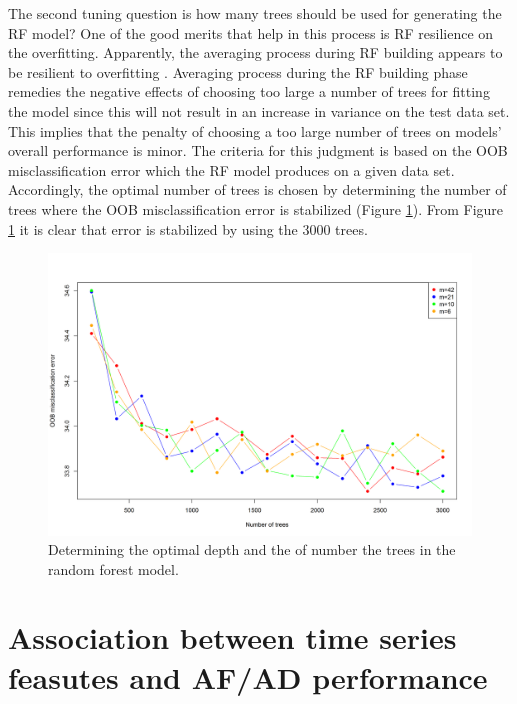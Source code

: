 \documentclass[]{elsarticle} %
\begin{document}
The second tuning question is how many trees should be used for
generating the RF model? One of the good merits that help in this
process is RF resilience on the overfitting. Apparently, the averaging
process during RF building appears to be resilient to overfitting
\citep{friedman2001elements}. Averaging process during the RF building
phase remedies the negative effects of choosing too large a number of
trees for fitting the model since this will not result in an increase in
variance on the test data set. This implies that the penalty of choosing
a too large number of trees on models' overall performance is minor. The
criteria for this judgment is based on the OOB misclassification error
which the RF model produces on a given data set. Accordingly, the
optimal number of trees is chosen by determining the number of trees
where the OOB misclassification error is stabilized (Figure
\ref{fig:tree_depth}). From Figure \ref{fig:tree_depth} it is clear that
error is stabilized by using the 3000 trees.

\begin{figure}[H]

{\centering \includegraphics[width=0.9\linewidth]{img/300dpi/Fig_tree_depth_and_ntrees} 

}

\caption{Determining the optimal depth and the of number the trees in the random forest model.}\label{fig:tree_depth}
\end{figure}

\hypertarget{res}{%
\section{Association between time series feasutes and AF/AD
performance}\label{res}}
\end{document}
